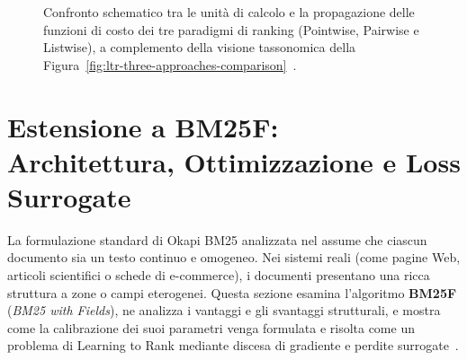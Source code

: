 \begin{figure}[H]
{%
}
\caption{Confronto schematico tra le unità di calcolo e la propagazione delle funzioni di costo dei tre paradigmi di ranking (Pointwise, Pairwise e Listwise), a complemento della visione tassonomica della Figura~\ref{fig:ltr-three-approaches-comparison}~\cite{bruch2023}.}
\label{fig:pointwise-pairwise-listwise-machinery}
\end{figure}

\FloatBarrier
\section[Estensione a BM25F e Ottimizzazione dei Parametri]{Estensione a BM25F:\\ Architettura, Ottimizzazione e Loss Surrogate}
\label{sec:bm25f-estensione-ottimizzazione}
\label{sec:bm25f-ottimizzazione-ltr}
\label{sec:bm25f-ottimizzazione-strutturata}

La formulazione standard di Okapi BM25 analizzata nel  assume che ciascun documento sia un testo continuo e omogeneo. Nei sistemi reali (come pagine Web, articoli scientifici o schede di e-commerce), i documenti presentano una ricca struttura a zone o campi eterogenei. Questa sezione esamina l'algoritmo \textbf{BM25F} (\textit{BM25 with Fields}), ne analizza i vantaggi e gli svantaggi strutturali, e mostra come la calibrazione dei suoi parametri venga formulata e risolta come un problema di Learning to Rank mediante discesa di gradiente e perdite surrogate~\cite{robertson2009,taylor2006}.


